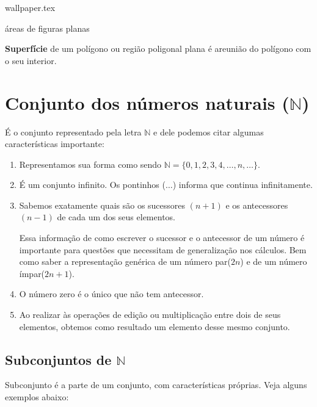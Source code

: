 \documentclass[10pt]{article}
\begin{document}
    {wallpaper.tex} %
        \begin{center}
            {\LARGE {\sc áreas de figuras planas}}
        \end{center}

\begin{definicao}
\textbf{Superfície} de um polígono ou região poligonal plana é areunião do polígono com o seu interior.
\end{definicao}

\section*{Conjunto dos números naturais (\( \mathbb{N} \))}
É o conjunto representado pela letra \( \mathbb{N}\) e dele podemos citar algumas características importante:

    \begin{enumerate}[label=\textbf{(\Roman*)}]
        \item Representamos sua forma como sendo \( \mathbb{N} = \{0, 1, 2, 3, 4, \ldots, n, \ldots\}\).
        \item É um conjunto infinito. Os pontinhos (\(\ldots\)) informa que continua infinitamente.
        \item Sabemos exatamente quais são os sucessores \((n+1)\) e os antecessores \((n-1)\) de cada um dos seus elementos.
        
        \begin{obs}
        Essa informação de como escrever o sucessor e o antecessor de um número é importante para questões que necessitam de generalização nos cálculos. Bem como saber a representação genérica de um número par(\(2n\)) e de um número ímpar(\(2n+1\)).
        \end{obs}
        \item O número zero é o único que não tem antecessor.
        \item Ao realizar às operações de edição ou multiplicação entre dois de seus elementos, obtemos como resultado um elemento desse mesmo conjunto.
    \end{enumerate}
\subsection*{Subconjuntos de \( \mathbb{N} \)}
Subconjunto é a parte de um conjunto, com características próprias. Veja alguns exemplos abaixo:
\end{document}
